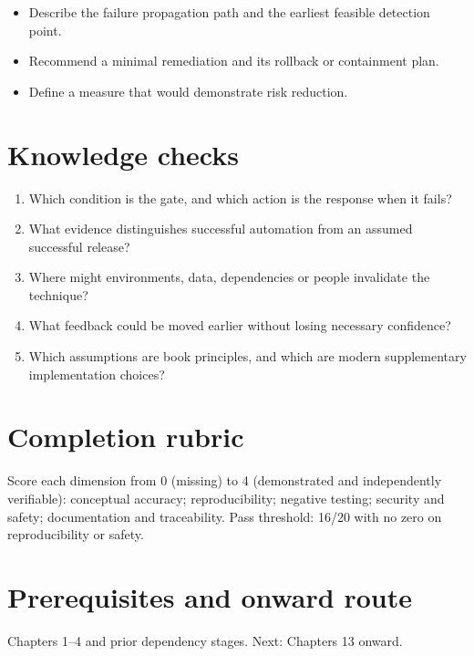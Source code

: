 \documentclass[10pt,letterpaper]{article}
\begin{document}
\begin{itemize}
\item Describe the failure propagation path and the earliest feasible detection point.
\item Recommend a minimal remediation and its rollback or containment plan.
\item Define a measure that would demonstrate risk reduction.
\end{itemize}

\section{Knowledge checks}
\begin{enumerate}
\item Which condition is the gate, and which action is the response when it fails?
\item What evidence distinguishes successful automation from an assumed successful release?
\item Where might environments, data, dependencies or people invalidate the technique?
\item What feedback could be moved earlier without losing necessary confidence?
\item Which assumptions are book principles, and which are modern supplementary implementation choices?
\end{enumerate}

\section{Completion rubric}
Score each dimension from 0 (missing) to 4 (demonstrated and independently verifiable): conceptual accuracy; reproducibility; negative testing; security and safety; documentation and traceability. Pass threshold: 16/20 with no zero on reproducibility or safety.


\section{Prerequisites and onward route}
Chapters 1--4 and prior dependency stages. Next: Chapters 13 onward.
\end{document}
